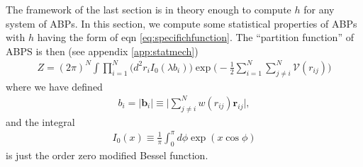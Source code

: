 \documentclass[twocolumn,amsmath,amssymb,aps]{revtex4-1}%
\begin{document}
The framework of the last section is in theory enough to compute $h$ for any
system of ABPs. In this section, we compute some statistical properties of
ABPs with $h$ having the form of eqn \ref{eq:specifichfunction}.
The ``partition function'' of ABPS is then (see appendix \ref{app:statmech})
\begin{align}\label{eq:partition}
  Z =(2\pi)^N\int\prod_{i=1}^N\big(d^2r_iI_0(\lambda b_i))
  \exp\bigg(-\frac{1}{2}\sum_{i=1}^N\sum_{j\neq i}^N
  \mathcal{V}(r_{ij})\bigg)
\end{align}
where we have defined
\begin{align}\label{eq:b_i}
  b_i = |\bm{b}_i|\equiv\bigg|\sum_{j\neq i}^Nw(r_{ij})
  \bm{r}_{ij}\bigg|,
\end{align}
and the integral
\begin{align}\label{eq:Iintegral}
  I_0(x)\equiv\frac{1}{\pi}\int_0^{\pi}d\phi\exp(x\cos\phi)
\end{align}
is just the order zero modified Bessel function.
\end{document}
